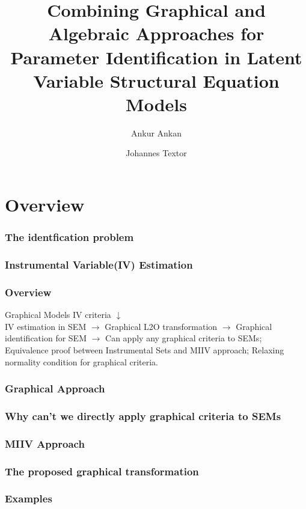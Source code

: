 \documentclass{beamer}
\begin{document}
\title[Combining Graphical and Algebraic Approaches for Parameter Identification in Latent Variable SEM]{Combining Graphical and Algebraic Approaches for Parameter Identification in Latent Variable Structural Equation Models}
\author {Ankur Ankan \and Johannes Textor}
\date{}
\maketitle

\section{Overview}
\begin{frame}
	\frametitle{The identfication problem}
\end{frame}

\begin{frame}
	\frametitle{Instrumental Variable(IV) Estimation}
\end{frame}

\begin{frame}
	\frametitle{Overview}
	Graphical Models IV criteria $\downarrow $ \\
	IV estimation in SEM $ \rightarrow $ Graphical L2O transformation $ \rightarrow $ Graphical identification for SEM $ \rightarrow $ Can apply any graphical criteria to SEMs; Equivalence proof between Instrumental Sets and MIIV approach; Relaxing normality condition for graphical criteria.
\end{frame}

\begin{frame}
	\frametitle{Graphical Approach}
\end{frame}

\begin{frame}
	\frametitle{Why can't we directly apply graphical criteria to SEMs}
\end{frame}

\begin{frame}
	\frametitle{MIIV Approach}
\end{frame}

\begin{frame}
	\frametitle{The proposed graphical transformation}
\end{frame}

\begin{frame}
	\frametitle{Examples}
\end{frame}
\end{document}
